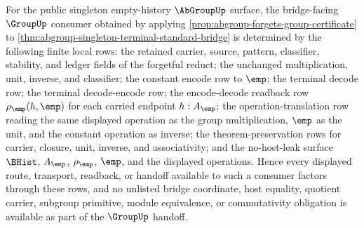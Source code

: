 \begin{lemma}
\label{lem:abgroup-forgets-group-bridge-determinacy}
For the public singleton empty-history $\AbGroupUp$ surface, the bridge-facing
$\GroupUp$ consumer obtained by applying
\autoref{prop:abgroup-forgets-group-certificate} to
\autoref{thm:abgroup-singleton-terminal-standard-bridge} is determined by the
following finite local rows: the retained carrier, source, pattern, classifier,
stability, and ledger fields of the forgetful reduct; the unchanged
multiplication, unit, inverse, and classifier; the constant encode row to
$\emp$; the terminal decode row; the terminal decode-encode row; the
encode-decode readback row $\rho_{\emp}(h,\emp)$ for each carried endpoint
$h:A_{\emp}$; the operation-translation row reading the same displayed
operation as the group multiplication, $\emp$ as the unit, and the constant
operation as inverse; the theorem-preservation rows for carrier, closure, unit,
inverse, and associativity; and the no-host-leak surface $\BHist$, $A_{\emp}$,
$\rho_{\emp}$, $\emp$, and the displayed operations. Hence every displayed
route, transport, readback, or handoff available to such a consumer factors
through these rows, and no unlisted bridge coordinate, host equality, quotient
carrier, subgroup primitive, module equivalence, or commutativity obligation is
available as part of the $\GroupUp$ handoff.
\end{lemma}

